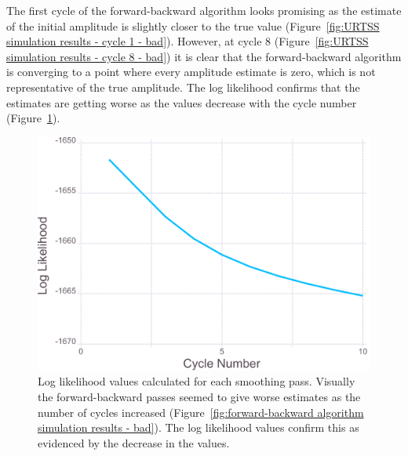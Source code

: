 The first cycle of the forward-backward algorithm looks promising as the estimate of the initial amplitude is slightly closer to the true value (Figure~\ref{fig:URTSS simulation results - cycle 1 - bad}).
However, at cycle 8 (Figure~\ref{fig:URTSS simulation results - cycle 8 - bad}) it is clear that the forward-backward algorithm is converging to a point where every amplitude estimate is zero, which is not representative of the true amplitude.
The log likelihood confirms that the estimates are getting worse as the values decrease with the cycle number (Figure~\ref{fig:Simulation Log likelihood - bad}).

\begin{figure}[ht!]
    \centering
    \includegraphics[width=1.0\textwidth]{figures/datared/loglik_bad.pdf}
    \caption{Log likelihood values calculated for each smoothing pass.
    Visually the forward-backward passes seemed to give worse estimates as the number of cycles increased (Figure~\ref{fig:forward-backward algorithm simulation results - bad}).
    The log likelihood values confirm this as evidenced by the decrease in the values.}
    \label{fig:Simulation Log likelihood - bad}
\end{figure}

